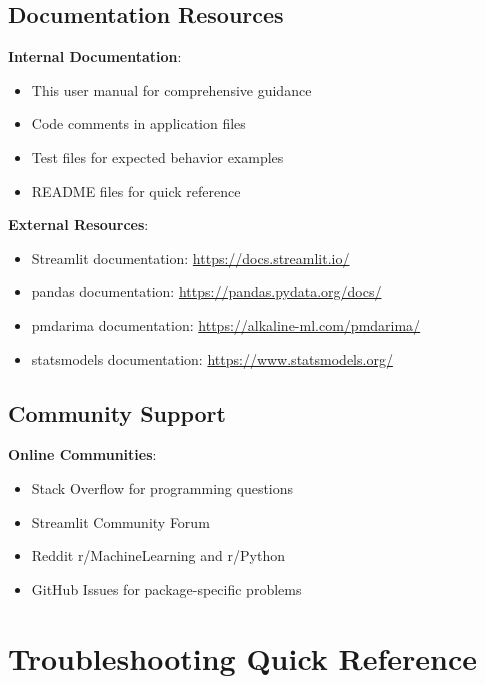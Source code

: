 \subsection{Documentation Resources}

\textbf{Internal Documentation}:
\begin{itemize}
	\item This user manual for comprehensive guidance
	\item Code comments in application files
	\item Test files for expected behavior examples
	\item README files for quick reference
\end{itemize}

\textbf{External Resources}:
\begin{itemize}
	\item Streamlit documentation: \url{https://docs.streamlit.io/}
	\item pandas documentation: \url{https://pandas.pydata.org/docs/}
	\item pmdarima documentation: \url{https://alkaline-ml.com/pmdarima/}
	\item statsmodels documentation: \url{https://www.statsmodels.org/}
\end{itemize}

\subsection{Community Support}

\textbf{Online Communities}:
\begin{itemize}
	\item Stack Overflow for programming questions
	\item Streamlit Community Forum
	\item Reddit r/MachineLearning and r/Python
	\item GitHub Issues for package-specific problems
\end{itemize}

\section{Troubleshooting Quick Reference}

